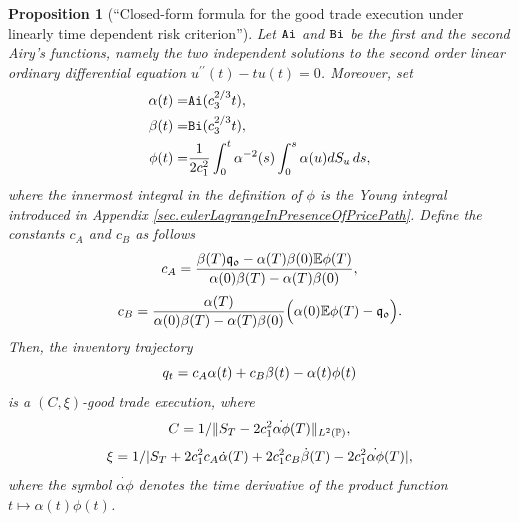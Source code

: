 \documentclass[10pt,a4paper]{article}
\newtheorem{prop}[thm]{Proposition}
\begin{document}
	\begin{prop}[``Closed-form formula for the good trade execution under linearly time dependent risk criterion'']\label{prop.goodTradeExecutionTimeIC}
		Let $\mathtt{Ai}$ and $\mathtt{Bi}$ be the first and the second Airy's functions, namely the two independent solutions to the second order linear ordinary differential equation $u^{\prime \prime}(t) - tu(t) = 0$. Moreover, set
		\begin{equation*}
		\begin{split}
		\alpha(t) =& \mathtt{Ai}(c_{3}^{2/3} t),\\
		\beta(t) =& \mathtt{Bi}(c_{3}^{2/3} t), \\
		\phi(t) =& \frac{1}{2c_{1}^{2}}\int_{0}^{t} \alpha^{-2}(s)\int_{0}^{s}\alpha(u)dS_u \,ds,
		\end{split}
		\end{equation*}
		where the innermost integral in the definition of $\phi$ is the Young integral introduced in Appendix \ref{sec.eulerLagrangeInPresenceOfPricePath}.
		Define the constants $c_A$ and $c_B$ as follows
		\begin{equation*}
		c_A = \frac{\beta(T)\mathfrak{q_0} - \alpha(T)\beta(0)\mathbb{{E}}\phi(T)}
		{\alpha(0)\beta(T) - \alpha(T)\beta(0)},
		\end{equation*}
			\begin{equation*}
		c_B = \frac{ \alpha(T)}
		{\alpha(0)\beta(T) - \alpha(T)\beta(0)}\Big(\alpha(0)\mathbb{{E}}\phi(T) - \mathfrak{q_0}\Big).
		\end{equation*}
		Then, the inventory trajectory 
		\begin{equation}\label{eq.goodTradeExecutionTimeIC}
		q_t = c_A \alpha(t) + c_B\beta(t) - \alpha(t) \phi(t)
		\end{equation}
		is a $(C,\xi)$-good trade execution, where
		\begin{equation*}
		C=1/
		\lVert 
		S_{T} - 2c_{1}^{2} \dot{\alpha \phi}(T) 
		\rVert_{L^{2}({\mathbb{P}})},
		\end{equation*}
		\begin{equation*}
		\xi=1/
		\lvert 
		S_{T} 
		+2c_{1}^{2} c_A\dot{\alpha}(T)
		+2c_{1}^{2} c_B \dot{\beta}(T)
		-2c_{1}^{2} \dot{\alpha \phi}(T)
		\rvert,
		\end{equation*}
		where the symbol $ \dot{\alpha \phi}$ denotes the time derivative of the product function $t\mapsto\alpha(t)\phi(t)$. 
	\end{prop}
\end{document}
